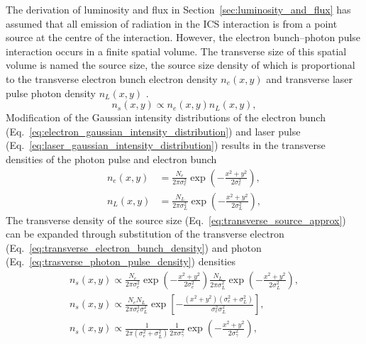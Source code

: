 \documentclass[../main.tex]{subfiles}
\begin{document}
The derivation of luminosity and flux in Section~\ref{sec:luminosity_and_flux} has assumed that all emission of radiation in the ICS interaction is from a point source at the centre of the interaction. However, the electron bunch--photon pulse interaction occurs in a finite spatial volume. The transverse size of this spatial volume is named the source size, the source size density of which is proportional to the transverse electron bunch electron density $n_{e}\left(x,y\right)$ and transverse laser pulse photon density $n_{L}\left(x,y\right)$ \cite{krafft2020personal}.
\begin{equation}
n_{s}\left(x,y\right) \propto n_{e}\left(x,y\right) n_{L}\left(x,y\right),
\label{eq:transverse_source_approx}    
\end{equation}
Modification of the Gaussian intensity distributions of the electron bunch (Eq.~\ref{eq:electron_gaussian_intensity_distribution}) and laser pulse (Eq.~\ref{eq:laser_gaussian_intensity_distribution}) results in the transverse densities of the photon pulse and electron bunch
\begin{align}
n_{e}\left(x,y\right) &= \frac{N_{e}}{2\pi\sigma_{e}^{2}}\exp\left(-\frac{x^{2}+y^{2}}{2\sigma_{e}^{2}}\right), 
\label{eq:transverse_electron_bunch_density}\\ 
n_{L}\left(x,y\right) &= \frac{N_{L}}{2\pi\sigma_{L}^{2}}\exp\left(-\frac{x^{2}+y^{2}}{2\sigma_{L}^{2}}\right),
\label{eq:trasverse_photon_pulse_density}
\end{align}
The transverse density of the source size (Eq.~\ref{eq:transverse_source_approx}) can be expanded through substitution of the transverse electron (Eq.~\ref{eq:transverse_electron_bunch_density}) and photon (Eq.~\ref{eq:trasverse_photon_pulse_density}) densities 
\begin{align}
n_{s}\left(x,y\right) \propto \frac{N_{e}}{2\pi\sigma_{e}^{2}}\exp\left(-\frac{x^{2}+y^{2}}{2\sigma_{e}^{2}}\right)\frac{N_{L}}{2\pi\sigma_{L}^{2}}\exp\left(-\frac{x^{2}+y^{2}}{2\sigma_{L}^{2}}\right), \nonumber \\
n_{s}\left(x,y\right) \propto \frac{N_{e}N_{L}}{2\pi\sigma_{e}^{3}\sigma_{L}^{2}}\exp\left[-\frac{\left(x^{2}+y^{2}\right)\left(\sigma_{e}^{2}+\sigma_{L}^{2}\right)}{\sigma_{e}^{2}\sigma_{L}^{2}}\right], \nonumber \\
n_{s}\left(x,y\right) \propto \frac{1}{2\pi\left(\sigma_{e}^{2}+\sigma_{L}^{2}\right)}\frac{1}{2\pi\sigma_{\gamma}^{2}}\exp\left(-\frac{x^{2}+y^{2}}{2\sigma_{\gamma}^{2}}\right),
\label{eq:expanded_transverse_source_density}    
\end{align}
\end{document}
